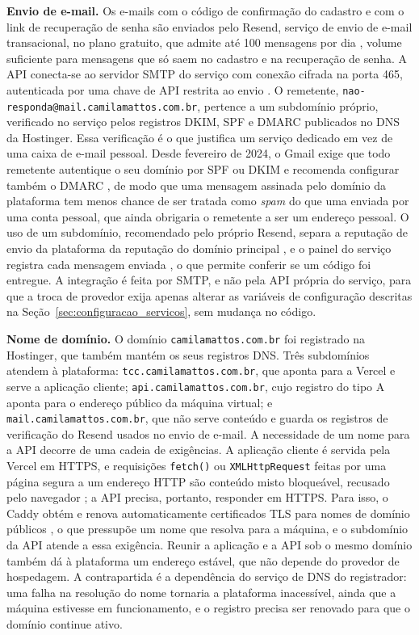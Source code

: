 \textbf{Envio de e-mail.} Os e-mails com o código de confirmação do cadastro e com o link de recuperação de senha são enviados pelo Resend, serviço
de envio de e-mail transacional, no plano gratuito, que admite até 100 mensagens por dia \cite{resend2026pricing}, volume suficiente para mensagens que só
saem no cadastro e na recuperação de senha. A API conecta-se ao servidor SMTP do serviço com conexão cifrada na porta 465, autenticada por uma chave de API
restrita ao envio \cite{resend2026smtp}. O remetente, \texttt{nao-responda@mail.camilamattos.com.br}, pertence a um subdomínio próprio, verificado no
serviço pelos registros DKIM, SPF e DMARC publicados no DNS da Hostinger. Essa verificação é o que justifica um serviço dedicado em vez de uma caixa de
e-mail pessoal. Desde fevereiro de 2024, o Gmail exige que todo remetente autentique o seu domínio por SPF ou DKIM e recomenda configurar também o DMARC
\cite{google2026senders}, de modo que uma mensagem assinada pelo domínio da plataforma tem menos chance de ser tratada como \textit{spam} do que uma
enviada por uma conta pessoal, que ainda obrigaria o remetente a ser um endereço pessoal. O uso de um subdomínio, recomendado pelo próprio Resend, separa a
reputação de envio da plataforma da reputação do domínio principal \cite{resend2026domains}, e o painel do serviço registra cada mensagem enviada
\cite{resend2026smtp}, o que permite conferir se um código foi entregue. A integração é feita por SMTP, e não pela API própria do serviço, para que a troca
de provedor exija apenas alterar as variáveis de configuração descritas na Seção~\ref{sec:configuracao_servicos}, sem mudança no código.

\textbf{Nome de domínio.} O domínio \texttt{camilamattos.com.br} foi registrado na Hostinger, que também mantém os seus registros DNS. Três subdomínios atendem à plataforma: \texttt{tcc.camilamattos.com.br}, que aponta para a Vercel e serve a aplicação cliente; \texttt{api.camilamattos.com.br}, cujo registro do tipo A aponta para o endereço público da máquina virtual; e \texttt{mail.camilamattos.com.br}, que não serve conteúdo e guarda os registros de verificação do Resend usados no envio de e-mail. A necessidade de um nome para a API decorre de uma cadeia de exigências. A aplicação cliente é servida pela Vercel em HTTPS, e requisições \texttt{fetch()} ou \texttt{XMLHttpRequest} feitas por uma página segura a um endereço HTTP são conteúdo misto bloqueável, recusado pelo navegador \cite{mdn2026mixed}; a API precisa, portanto, responder em HTTPS. Para isso, o Caddy obtém e renova automaticamente certificados TLS para nomes de domínio públicos \cite{caddy2026https}, o que pressupõe um nome que resolva para a máquina, e o subdomínio da API atende a essa exigência. Reunir a aplicação e a API sob o mesmo domínio também dá à plataforma um endereço estável, que não depende do provedor de hospedagem. A contrapartida é a dependência do serviço de DNS do registrador: uma falha na resolução do nome tornaria a plataforma inacessível, ainda que a máquina estivesse em funcionamento, e o registro precisa ser renovado para que o domínio continue ativo.

